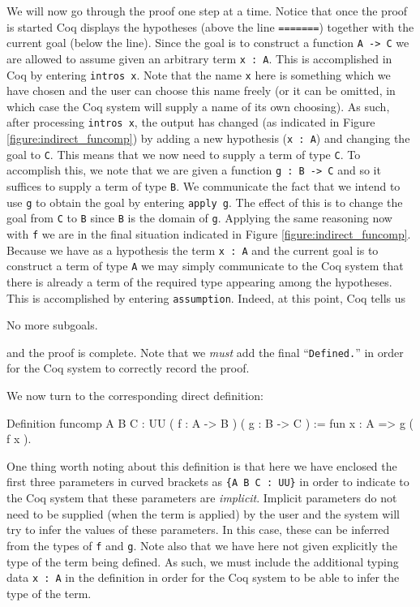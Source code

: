 We will now go through the proof one step at a time.  Notice that once the proof is started Coq
displays the hypotheses (above the line \verb|=======|) together
with the current goal (below the line).  Since the goal is to
construct a function \verb|A -> C| we are allowed to assume given an
arbitrary term \verb|x : A|.  This is accomplished in Coq by
entering \verb|intros x|.  Note that the name \verb|x| here
is something which we have chosen and the user can choose this name
freely (or it can be omitted, in which case the Coq system will supply
a name of its own choosing).  As such, after processing
\verb|intros x|, the output has changed (as indicated in Figure
\ref{figure:indirect_funcomp}) by adding a new hypothesis 
(\verb|x : A|) and changing the goal to \verb|C|.  This means that we now
need to supply a term of type \verb|C|.  To accomplish this, we
note that we are given a function \verb|g : B -> C| and so it
suffices to supply a term of type \verb|B|.  We communicate the
fact that we intend to use \verb|g| to obtain the goal by
entering \verb|apply g|.  The effect of this is to change the
goal from \verb|C| to \verb|B| since \verb|B| is the
domain of \verb|g|.  Applying the same reasoning now with
\verb|f| we are in the final situation indicated in Figure
\ref{figure:indirect_funcomp}.  Because we have as a hypothesis the term
\verb|x : A| and the current goal is to construct a term of type
\verb|A| we may simply communicate to the Coq system that
there is already a term of the required type appearing among the
hypotheses.  This is accomplished by entering \verb|assumption|.
Indeed, at this point, Coq tells us
\begin{center}
  \begin{coqcode}
No more subgoals.
  \end{coqcode}
\end{center}
and the proof is complete.  Note that we \emph{must} add the final
``\verb|Defined.|'' in order for the Coq system to correctly
record the proof.

We now turn to the corresponding direct definition:
\begin{center}
  \begin{coqcode}
Definition funcomp { A B C : UU } ( f : A -> B ) ( g : B -> C ) := fun x : A => g ( f x ).
  \end{coqcode}
\end{center}
One thing worth noting about this definition is that here we have
enclosed the first three parameters in curved brackets as \verb|{A B C : UU}| in order to indicate to the Coq system that these
parameters are \emph{implicit}.  Implicit parameters do not need to be
supplied (when the term is applied) by the user and the system will
try to infer the values of these parameters.  In this case, these can
be inferred from the types of \verb|f| and \verb|g|.  Note
also that we have here not given explicitly the type of the term being
defined.  As such, we must include the additional typing data
\verb|x : A| in the definition in order for the Coq system to be
able to infer the type of the term. 


